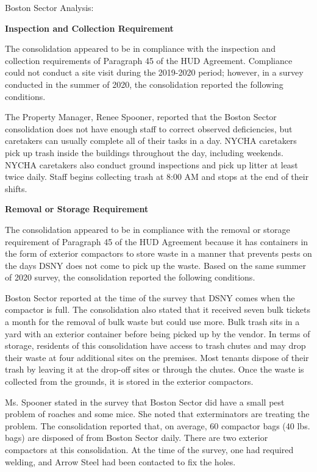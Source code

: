 Boston Sector Analysis: 

\textbf{Inspection and Collection Requirement} 

 

The consolidation appeared to be in compliance with the inspection and collection requirements of Paragraph 45 of the HUD Agreement. Compliance could not conduct a site visit during the 2019-2020 period; however, in a survey conducted in the summer of 2020, the consolidation reported the following conditions.

The Property Manager, Renee Spooner, reported that the Boston Sector consolidation does not have enough staff to correct observed deficiencies, but caretakers can usually complete all of their tasks in a day. NYCHA caretakers pick up trash inside the buildings throughout the day, including weekends. NYCHA caretakers also conduct ground inspections and pick up litter at least twice daily. Staff begins collecting trash at 8:00 AM and stops at the end of their shifts.

\textbf{Removal or Storage Requirement}

The consolidation appeared to be in compliance with the removal or storage requirement of Paragraph  45 of the HUD Agreement because it has containers in the form of exterior compactors to store waste in a manner that prevents pests on the days DSNY does not come to pick up the waste. Based on the same summer of  2020 survey, the consolidation reported the following conditions.

  

Boston Sector reported at the time of the survey that DSNY comes when the compactor is full.  The consolidation also stated that it received seven bulk tickets a month for the removal of bulk waste but could use more. Bulk trash sits in a yard with an exterior container before being picked up by the vendor. In terms of storage, residents of this consolidation have access to trash chutes and may drop their waste at four additional sites on the premises. Most tenants dispose of their trash by leaving it at the drop-off sites or through the chutes. Once the waste is collected from the grounds, it is stored in the exterior compactors.  

Ms. Spooner stated in the survey that Boston Sector did have a small pest problem of roaches and some mice. She noted that exterminators are treating the problem. The consolidation reported that, on average, 60 compactor bags (40 lbs. bags) are disposed of from Boston Sector daily. There are two exterior compactors at this consolidation. At the time of the survey, one had required welding, and Arrow Steel had been contacted to fix the holes. 

